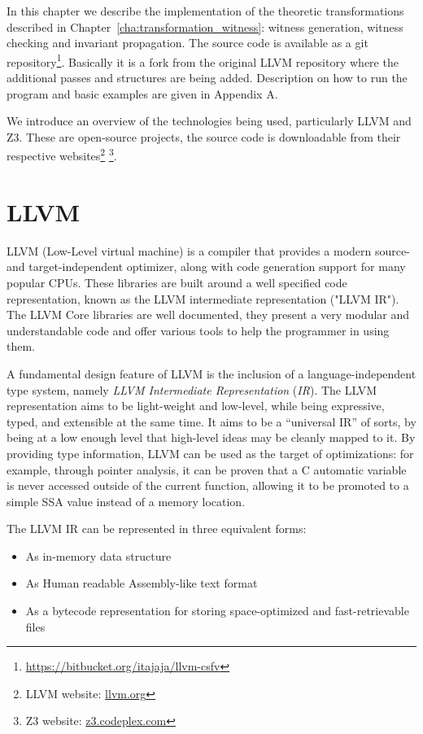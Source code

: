 
In this chapter we describe the implementation of the theoretic transformations described in Chapter~\ref{cha:transformation_witness}: witness generation, witness checking and invariant propagation. The source code is available as a git repository\footnote{\url{https://bitbucket.org/itajaja/llvm-csfv}}. Basically it is a fork from the original LLVM repository where the additional passes and structures are being added. Description on how to run the program and basic examples are given in Appendix A.

We introduce an overview of the technologies being used, particularly LLVM and Z3. These are open-source projects, the source code is downloadable from their respective websites\footnote{LLVM website: \url{llvm.org}} \footnote{Z3 website: \url{z3.codeplex.com}}.

\section{LLVM}
\label{sec:llvm}

LLVM (Low-Level virtual machine) is a compiler that provides a modern source- and target-independent optimizer, along with code generation support for many popular CPUs. These libraries are built around a well specified code representation, known as the LLVM intermediate representation ("LLVM IR"). The LLVM Core libraries are well documented, they present a very modular and understandable code and offer various tools to help the programmer in using them.

A fundamental design feature of LLVM is the inclusion of a language-independent type system, namely \emph{LLVM Intermediate Representation} (\emph{IR}). The LLVM representation aims to be light-weight and low-level, while being expressive, typed, and extensible at the same time. It aims to be a ``universal IR'' of sorts, by being at a low enough level that high-level ideas may be cleanly mapped to it. By providing type information, LLVM can be used as the target of optimizations: for example, through pointer analysis, it can be proven that a C automatic variable is never accessed outside of the current function, allowing it to be promoted to a simple SSA value instead of a memory location.

The LLVM IR can be represented in three equivalent forms:
\begin{itemize}
  \item As in-memory data structure
  \item As Human readable Assembly-like text format
  \item As a bytecode representation for storing space-optimized and fast-retrievable files
\end{itemize}


